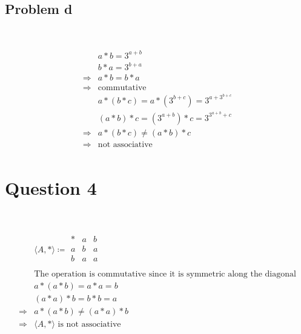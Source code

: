 \documentclass{article}
\begin{document}
~

\subsection*{Problem d}

~

\begin{equation}
    \begin{split}
        &a*b=3^{a+b}\\
        &b*a=3^{b+a}\\
        \Rightarrow&a*b=b*a\\
        \Rightarrow&\text{commutative}\\
        &a*(b*c)=a*(3^{b+c})=3^{a+3^{b+c}}\\
        &(a*b)*c=(3^{a+b})*c=3^{3^{a+b}+c}\\
        \Rightarrow&a*(b*c)\ne (a*b)*c\\
        \Rightarrow&\text{not associative}\\
    \end{split}
\end{equation}

\newpage

\section*{Question 4}

~

\begin{equation*}
    \begin{split}
        &\langle A,*\rangle\coloneqq\begin{array}{c|cc}
            *&a&b\\
            \hline
            a&b&a\\
            b&a&a\\
        \end{array}\\
        &\text{The operation is commutative since it is symmetric along the diagonal}\\
        &a*(a*b)=a*a=b\\
        &(a*a)*b=b*b=a\\
        \Rightarrow&a*(a*b)\ne(a*a)*b\\
        \Rightarrow&\langle A,*\rangle\text{ is not associative}
    \end{split}
\end{equation*}

\newpage
\end{document}
